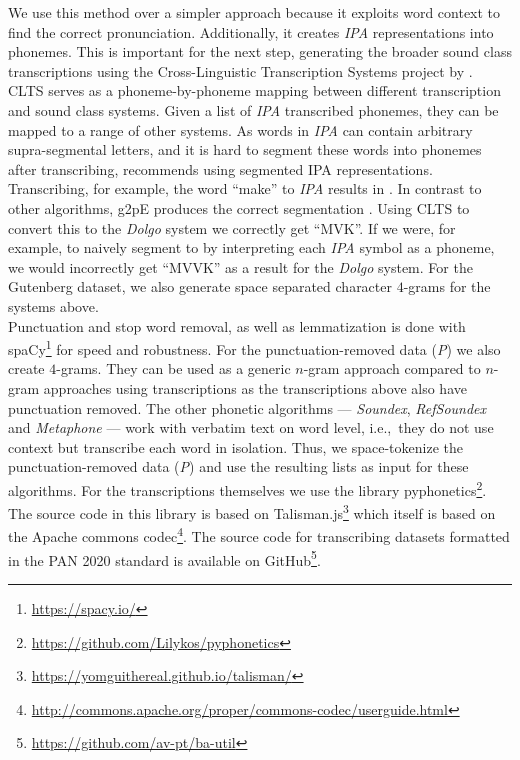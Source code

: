 We use this method over a simpler approach because it exploits word context to find the correct pronunciation.
Additionally, it creates \textit{IPA} representations  into phonemes.
This is important for the next step, generating the broader sound class transcriptions using the Cross-Linguistic Transcription Systems project by \cite{list2018cltsIntro}.
CLTS serves as a phoneme-by-phoneme mapping between different transcription and sound class systems.
Given a list of \textit{IPA} transcribed phonemes, they can be mapped to a range of other systems.
As words in \textit{IPA} can contain arbitrary supra-segmental letters, and it is hard to segment these words into phonemes after transcribing, \cite{list2018sequence} recommends using segmented IPA representations.
Transcribing, for example, the word ``make'' to \textit{IPA} results in \textipa{[meIk]}.
In contrast to other algorithms, g2pE produces the correct segmentation \textipa{[m eI k]}.
Using CLTS to convert this to the \textit{Dolgo} system we correctly get ``MVK''.
If we were, for example, to naively segment \textipa{[meIk]} to \textipa{[m e I k]} by interpreting each \textit{IPA} symbol as a phoneme, we would incorrectly get ``MVVK'' as a result for the \textit{Dolgo} system.
For the Gutenberg dataset, we also generate space separated character $4$-grams for the systems above.\\
Punctuation and stop word removal, as well as lemmatization is done with spaCy\footnote{\url{https://spacy.io/}} for speed and robustness.
For the punctuation-removed data (\textit{P}) we also create $4$-grams.
They can be used as a generic $n$-gram approach compared to $n$-gram approaches using transcriptions as the transcriptions above also have punctuation removed.
The other phonetic algorithms --- \textit{Soundex}, \textit{RefSoundex} and \textit{Metaphone} --- work with verbatim text on word level, i.e.,\ they do not use context but transcribe each word in isolation.
Thus, we space-tokenize the punctuation-removed data (\textit{P}) and use the resulting lists as input for these algorithms.
For the transcriptions themselves we use the library pyphonetics\footnote{\url{https://github.com/Lilykos/pyphonetics}}.
The source code in this library is based on Talisman.js\footnote{\url{https://yomguithereal.github.io/talisman/}} which itself is based on the Apache commons codec\footnote{\url{http://commons.apache.org/proper/commons-codec/userguide.html}}.
The source code for transcribing datasets formatted in the PAN 2020 standard is available on GitHub\footnote{\url{https://github.com/av-pt/ba-util}}.

